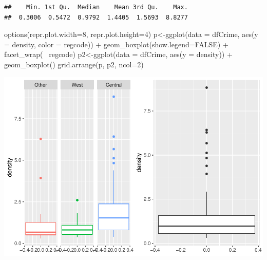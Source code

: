 \documentclass[]{article}
\newenvironment{Shaded}{}{}
\newcommand{\DataTypeTok}[1]{#1}
\newcommand{\DecValTok}[1]{#1}
\newcommand{\KeywordTok}[1]{\textcolor[rgb]{0.00,0.00,1.00}{#1}}
\newcommand{\NormalTok}[1]{#1}
\newcommand{\OperatorTok}[1]{#1}
\newcommand{\OtherTok}[1]{\textcolor[rgb]{1.00,0.25,0.00}{#1}}
\newcommand{\StringTok}[1]{\textcolor[rgb]{0.00,0.50,0.50}{#1}}
\begin{document}
\begin{Shaded}
\end{Shaded}

\begin{verbatim}
##    Min. 1st Qu.  Median    Mean 3rd Qu.    Max. 
##  0.3006  0.5472  0.9792  1.4405  1.5693  8.8277
\end{verbatim}

\begin{Shaded}
\begin{Highlighting}[]
\KeywordTok{options}\NormalTok{(}\DataTypeTok{repr.plot.width=}\DecValTok{8}\NormalTok{, }\DataTypeTok{repr.plot.height=}\DecValTok{4}\NormalTok{)}
\NormalTok{p<-}\KeywordTok{ggplot}\NormalTok{(}\DataTypeTok{data =}\NormalTok{ dfCrime, }\KeywordTok{aes}\NormalTok{(}\DataTypeTok{y =}\NormalTok{ density, }\DataTypeTok{color =}\NormalTok{ regcode)) }\OperatorTok{+}
\StringTok{     }\KeywordTok{geom_boxplot}\NormalTok{(}\DataTypeTok{show.legend=}\OtherTok{FALSE}\NormalTok{) }\OperatorTok{+}\StringTok{ }\KeywordTok{facet_wrap}\NormalTok{(}\OperatorTok{~}\StringTok{ }\NormalTok{regcode)}
\NormalTok{p2<-}\KeywordTok{ggplot}\NormalTok{(}\DataTypeTok{data =}\NormalTok{ dfCrime, }\KeywordTok{aes}\NormalTok{(}\DataTypeTok{y =}\NormalTok{ density)) }\OperatorTok{+}
\StringTok{     }\KeywordTok{geom_boxplot}\NormalTok{()}
\KeywordTok{grid.arrange}\NormalTok{(p, p2, }\DataTypeTok{ncol=}\DecValTok{2}\NormalTok{)}
\end{Highlighting}
\end{Shaded}

\includegraphics{Bagnard_Gaustad_Hartman_Leung_Lab_3_files/figure-latex/unnamed-chunk-78-1.pdf}
\end{document}
